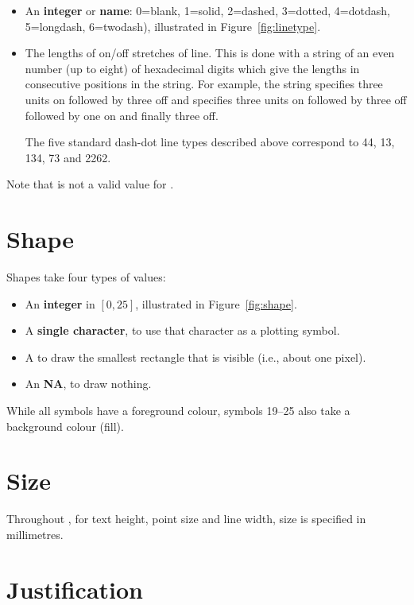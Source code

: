 \begin{itemize}
  \item An {\bf integer} or {\bf name}: 0=blank, 1=solid, 2=dashed, 3=dotted, 4=dotdash, 5=longdash, 6=twodash), illustrated in Figure~\ref{fig:linetype}.

  \item The lengths of on/off stretches of line. This is done with a string of an even number (up to eight) of hexadecimal digits which give the lengths in consecutive positions in the string. For example, the string  specifies three units on followed by three off and  specifies three units on followed by three off followed by one on and finally three off. 
  
  The five standard dash-dot line types described above correspond to 44, 13, 134, 73 and 2262.
\end{itemize} 

Note that  is not a valid value for .

\section{Shape}
\label{sec:shape_spec}

Shapes take four types of values:

\begin{itemize}
  \item An {\bf integer} in $[0, 25]$, illustrated in Figure~\ref{fig:shape}.

  \item A {\bf single character}, to use that character as a plotting symbol.   

  \item A  to draw the smallest rectangle that is visible (i.e., about one pixel).
  
  \item An {\bf NA}, to draw nothing.
\end{itemize}

While all symbols have a foreground colour, symbols 19--25 also take a background colour (fill). 

\section{Size}
\label{sec:size}

Throughout \ggplot, for text height, point size and line width, size is specified in millimetres.

\section{Justification}
\label{sec:justification_spec}

